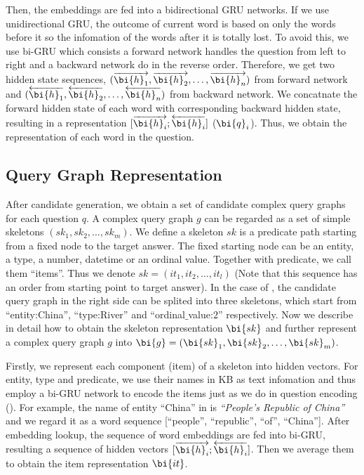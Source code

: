 Then, the embeddings are fed into a bidirectional GRU networks. If we use unidirectional GRU, the outcome of current word is based on only the words before it so the infomation of the words after it is totally lost. To avoid this, we use bi-GRU which consists a forward network handles the question from left to right and a backward network do in the reverse order. Therefore, we get two hidden state sequences, $(\overrightarrow{\bi{h}_1}, \overrightarrow{\bi{h}_2}, \dots, \overrightarrow{\bi{h}_n})$ from forward network and $(\overleftarrow{\bi{h}_1}, \overleftarrow{\bi{h}_2}, \dots, \overleftarrow{\bi{h}_n})$ from backward network. We concatnate the forward hidden state of each word with corresponding backward hidden state, resulting in a representation $[\overrightarrow{\bi{h}_i};\overleftarrow{\bi{h}_i}]$ ($\bi{q}_i$). Thus, we obtain the representation of each word in the question.


\subsection{Query Graph Representation}
\label{sec:schema-encoding}

After candidate generation, we obtain a set of candidate complex query graphs for each question $q$. A complex query graph $g$ can be regarded as a set of simple skeletons $(sk_1, sk_2, \dots, sk_m)$. We define a skeleton $sk$ is a predicate path starting from a fixed node to the target answer. The fixed starting node can be an entity, a type, a number, datetime or an ordinal value. Together with predicate, we call them ``items''. Thus we denote $sk = (it_1, it_2, \dots, it_l)$ (Note that this sequence has an order from starting point to target answer). In the case of , the candidate query graph in the right side can be splited into three skeletons, which start from ``entity:China'', ``type:River'' and ``ordinal$\_$value:$2$'' respectively. 
Now we describe in detail how to obtain the skeleton representation $\bi{sk}$ and further represent a complex query graph $g$ into $\bi{g} = (\bi{sk}_1, \bi{sk}_2, \dots, \bi{sk}_m)$. 

Firstly, we represent each component (item) of a skeleton into hidden vectors. For entity, type and predicate, we use their names in KB as text infomation and thus employ a bi-GRU network to encode the items just as we do in question encoding (). For example, the name of entity ``China'' in  is \textit{``People's Republic of China''} and we regard it as a word sequence [``people'', ``republic'', ``of'', ``China'']. After embedding lookup, the sequence of word embeddings are fed into bi-GRU, resulting a sequence of hidden vectors $[\overrightarrow{\bi{h}_i};\overleftarrow{\bi{h}_i}]$. Then we average them to obtain the item representation $\bi{it}$.

